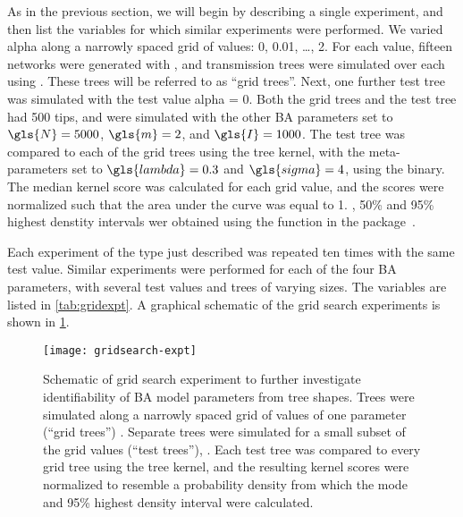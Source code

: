 As in the previous section, we will begin by describing a single experiment,
and then list the variables for which similar experiments were performed. We
varied \gls{alpha} along a narrowly spaced grid of values: 0, 0.01, \ldots, 2.
For each value, fifteen networks were generated with , and
transmission trees were simulated over each using . These
trees will be referred to as ``grid trees''. Next, one further test tree was
simulated with the test value \gls{alpha} = 0. Both the grid trees and the test
tree had 500 tips, and were simulated with the other \gls{BA} parameters set to
 $\gls{N} = 5000$, $\gls{m} = 2$, and $\gls{I} = 1000$.
The test tree was compared to each of the grid trees using the tree kernel,
with the meta-parameters set to $\gls{lambda} = 0.3$ and $\gls{sigma} = 4$,
using the  binary. The median kernel score was calculated
for each grid value, and the scores were normalized such that the area under
the curve was equal to 1.  , 50\% and 95\% highest denstity intervals wer
obtained using the  function in the 
package~\autocite{snow2013teachingdemos}. 

Each experiment of the type just described was repeated ten times with the same
test value. Similar experiments were performed for each of the four \gls{BA}
parameters, with several test values and trees of varying sizes. The variables
are listed in \cref{tab:gridexpt}. A graphical schematic of the grid search
experiments is shown in \cref{fig:gridexpt}. 

\begin{figure}[ht]
    \centering
    \texttt{[image: gridsearch-expt]}
    \caption[
        Schematic of grid search experiment to further investigate
        identifiability of BA model parameters from tree shapes.
    ]{
        Schematic of grid search experiment to further investigate
        identifiability of BA model parameters from tree shapes. Trees were
        simulated along a narrowly spaced grid of values of one parameter
        (``grid trees'') .
        Separate trees were simulated for a small subset of the grid values
        (``test trees''), . Each
        test tree was compared to every grid tree using the tree kernel, and
        the resulting kernel scores were normalized to resemble a probability
        density from which the mode and 95\% highest density interval were
        calculated.
    }
    \label{fig:gridexpt}
\end{figure}

